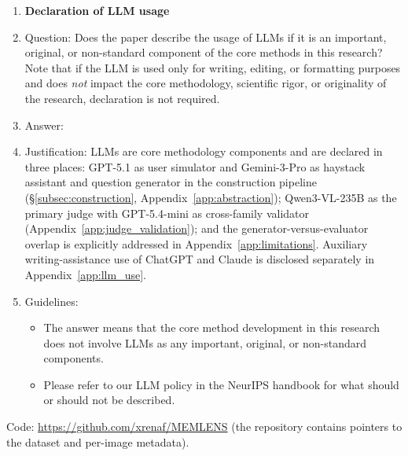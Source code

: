 \documentclass{article}
\begin{document}
\begin{enumerate}
\item {\bf Declaration of LLM usage}
    \item[] Question: Does the paper describe the usage of LLMs if it is an important, original, or non-standard component of the core methods in this research? Note that if the LLM is used only for writing, editing, or formatting purposes and does \emph{not} impact the core methodology, scientific rigor, or originality of the research, declaration is not required.
    \item[] Answer: \answerYes{}
    \item[] Justification: LLMs are core methodology components and are declared in three places: GPT-5.1 as user simulator and Gemini-3-Pro as haystack assistant and question generator in the construction pipeline (\S\ref{subsec:construction}, Appendix~\ref{app:abstraction}); Qwen3-VL-235B as the primary judge with GPT-5.4-mini as cross-family validator (Appendix~\ref{app:judge_validation}); and the generator-versus-evaluator overlap is explicitly addressed in Appendix~\ref{app:limitations}. Auxiliary writing-assistance use of ChatGPT and Claude is disclosed separately in Appendix~\ref{app:llm_use}.
    \item[] Guidelines:
    \begin{itemize}
        \item The answer \answerNA{} means that the core method development in this research does not involve LLMs as any important, original, or non-standard components.
        \item Please refer to our LLM policy in the NeurIPS handbook for what should or should not be described.
    \end{itemize}

\end{enumerate}
\fi %

\bigskip
\noindent Code: \url{https://github.com/xrenaf/MEMLENS} (the repository contains pointers to the dataset and per-image metadata).
\end{document}
